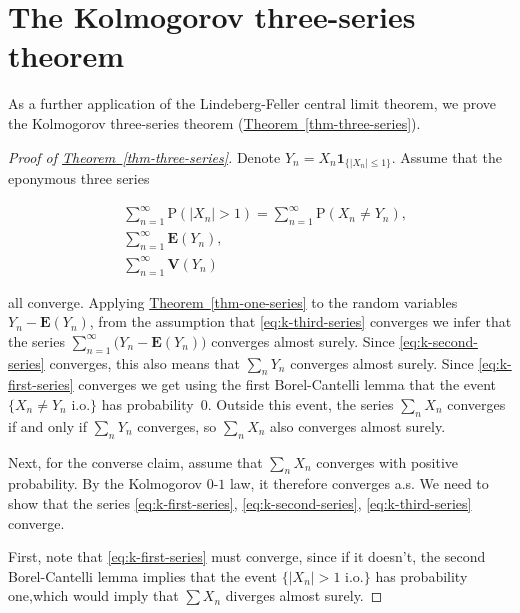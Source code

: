 \documentclass[11pt]{report}
\theoremstyle{plain}
\theoremstyle{definition}
\begin{document}
\section{The Kolmogorov three-series theorem}
\label{sec-k-3-series}

As a further application of the Lindeberg-Feller
central limit theorem, we prove the Kolmogorov
three-series theorem (\hyperref[thm-three-series]{Theorem~\ref*{thm-three-series}}).

\begin{proof}[Proof of \texorpdfstring{\hyperref[thm-three-series]{Theorem~\ref*{thm-three-series}}}{Theorem}]
Denote $Y_n = X_n \mathbf{1}_{\{|X_n|\le 1\}}$.
Assume that the eponymous three series

\begin{align*}
\tag{17}\label{eq:k-first-series} &\sum_{n=1}^\infty \mathrm{P}(|X_n|>1) = \sum_{n=1}^\infty \mathrm{P}(X_n\neq Y_n), \\
\tag{18}\label{eq:k-second-series} &\sum_{n=1}^\infty \mathbf{E}(Y_n), \\
\tag{19}\label{eq:k-third-series} &\sum_{n=1}^\infty \mathbf{V}(Y_n)
\end{align*}

\noindent all converge. Applying \hyperref[thm-one-series]{Theorem~\ref*{thm-one-series}} to
the random variables $Y_n-\mathbf{E}(Y_n)$, from the
assumption that \eqref{eq:k-third-series} converges we
infer that the series
$\sum_{n=1}^\infty \big( Y_n-\mathbf{E}(Y_n) \big)$
converges almost surely. Since \eqref{eq:k-second-series}
converges, this also means that $\sum_n Y_n$
converges almost surely. Since \eqref{eq:k-first-series}
converges we get using the first Borel-Cantelli lemma
that the event $\{ X_n \neq Y_n\textrm{ i.o.} \}$ has
probability~$0$. Outside this event, the series
$\sum_n X_n$ converges if and only if $\sum_n Y_n$
converges, so $\sum_n X_n$ also converges almost
surely.

Next, for the converse claim, assume that $\sum_n X_n$
converges with positive probability. By the Kolmogorov
$0$-$1$ law, it therefore converges a.s. We need to
show that the series \eqref{eq:k-first-series},
\eqref{eq:k-second-series}, \eqref{eq:k-third-series}
converge.

First, note that \eqref{eq:k-first-series} must converge,
since if it doesn't, the second Borel-Cantelli lemma
implies that the event $\{ |X_n|>1 \textrm{ i.o.} \}$
has probability one,which would imply that $\sum X_n$
diverges almost surely.


\end{proof}
\end{document}
